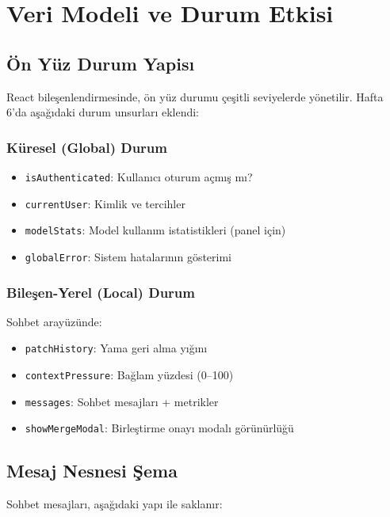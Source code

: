\documentclass[12pt,a4paper]{article}
\begin{document}
\section{Veri Modeli ve Durum Etkisi}

\subsection{Ön Yüz Durum Yapisı}

React bileşenlendirmesinde, ön yüz durumu çeşitli seviyelerde yönetilir. Hafta 6'da aşağıdaki durum unsurları eklendi:

\subsubsection{Küresel (Global) Durum}
\begin{itemize}[leftmargin=*]
  \item \texttt{isAuthenticated}: Kullanıcı oturum açmış mı?
  \item \texttt{currentUser}: Kimlik ve tercihler
  \item \texttt{modelStats}: Model kullanım istatistikleri (panel için)
  \item \texttt{globalError}: Sistem hatalarının gösterimi
\end{itemize}

\subsubsection{Bileşen-Yerel (Local) Durum}
Sohbet arayüzünde:
\begin{itemize}[leftmargin=*]
  \item \texttt{patchHistory}: Yama geri alma yığını
  \item \texttt{contextPressure}: Bağlam yüzdesi (0--100)
  \item \texttt{messages}: Sohbet mesajları + metrikler
  \item \texttt{showMergeModal}: Birleştirme onayı modalı görünürlüğü
\end{itemize}

\subsection{Mesaj Nesnesi Şema}

Sohbet mesajları, aşağıdaki yapı ile saklanır:
\end{document}
